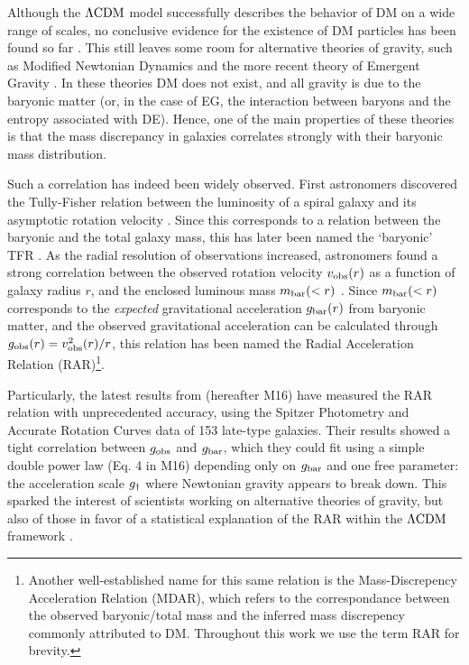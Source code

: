 \documentclass[fleqn,usenatbib]{mnras}
\newcommand{\lcdm}{{\rm \Lambda CDM}}
\newcommand{\un}[1]{_{\rm #1}}
\begin{document}
Although the $\lcdm$ model successfully describes the behavior of DM on a wide range of scales, no conclusive evidence for the existence of DM particles has been found so far \cite[despite years of enormous effort; for an overview, see][]{bertone2005,bertone2018}. This still leaves some room for alternative theories of gravity, such as Modified Newtonian Dynamics  \cite[MOND,][]{milgrom1983} and the more recent theory of Emergent Gravity \cite[EG,][]{verlinde2016}. In these theories DM does not exist, and all gravity is due to the baryonic matter (or, in the case of EG, the interaction between baryons and the entropy associated with DE). Hence, one of the main properties of these theories is that the mass discrepancy in galaxies correlates strongly with their baryonic mass distribution.

Such a correlation has indeed been widely observed. First astronomers discovered the Tully-Fisher relation \cite[TFR,][]{tully1977} between the luminosity of a spiral galaxy and its asymptotic rotation velocity \cite[]{pierce1988,bernstein1994}. Since this corresponds to a relation between the baryonic and the total galaxy mass, this has later been named the `baryonic' TFR \cite[BTFR,][]{mcgaugh2000,mcgaugh2012}. As the radial resolution of observations increased, astronomers found a strong correlation between the observed rotation velocity $v\un{obs}(r)$ as a function of galaxy radius $r$, and the enclosed luminous mass \mbox{$m\un{bar}(<r)$} \cite[]{sanders1986,sanders1996,mcgaugh2004,sanders2007,wu2015}. Since $m\un{bar}(<r)$ corresponds to the \emph{expected} gravitational acceleration $g\un{bar}(r)$ from baryonic matter, and the observed gravitational acceleration can be calculated through $g\un{obs}(r)=v\un{obs}^2(r)/r$, this relation has been named the Radial Acceleration Relation (RAR)\footnote{Another well-established name for this same relation is the Mass-Discrepency Acceleration Relation (MDAR), which refers to the correspondance between the observed baryonic/total mass and the inferred mass discrepency commonly attributed to DM. Throughout this work we use the term RAR for brevity.}.

Particularly, the latest results from \cite{mcgaugh2016} (hereafter M16) have measured the RAR relation with unprecedented accuracy, using the Spitzer Photometry and Accurate Rotation Curves \cite[SPARC,][]{lelli2016b} data of 153 late-type galaxies. Their results showed a tight correlation between $g\un{obs}$ and $g\un{bar}$, which they could fit using a simple double power law (Eq. 4 in M16) depending only on $g\un{bar}$ and one free parameter: the acceleration scale $g\un{\dagger}$ where Newtonian gravity appears to break down. This sparked the interest of scientists working on alternative theories of gravity, but also of those in favor of a statistical explanation of the RAR within the $\lcdm$ framework \cite[]{keller2017,desmond2017,ludlow2017}.
\end{document}
